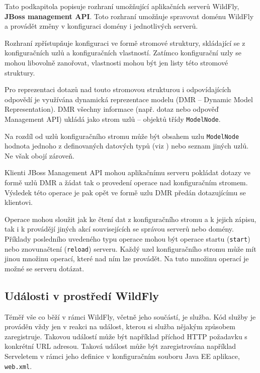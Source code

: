Tato podkapitola popisuje rozhraní umožňující aplikačních serverů WildFly, {\bf JBoss management API}.
Toto rozhraní umožňuje spravovat doménu WildFly a provádět změny v konfiguraci domény i jednotlivých serverů.
\cite{jbossDetypedManagement}

Rozhraní zpřístupňuje konfiguraci ve formě stromové struktury, skládající se z konfiguračních uzlů a konfiguračních vlastností.
Zatímco konfigurační uzly se mohou libovolně zanořovat, vlastnosti mohou být jen listy této stromové struktury.
\cite{jbossDetypedManagement}

Pro reprezentaci dotazů nad touto stromovou strukturou i odpovídajících odpovědí je využívána dynamická reprezentace modelu (DMR -- Dynamic Model Representation).
DMR všechny informace (např. dotaz nebo odpověď Management API) ukládá jako strom uzlů -- objektů třídy {\tt ModelNode}.
\cite{jbossDetypedManagement}

Na rozdíl od uzlů konfiguračního stromu může být obsahem uzlu {\tt ModelNode} hodnota jednoho z definovaných datových typů (viz \cite{jboss7slideShare}) nebo seznam jiných uzlů. Ne však obojí zároveň.
\cite{jboss7slideShare}

Klienti JBoss Management API mohou aplikačnímu serveru pokládat dotazy ve formě uzlů DMR a žádat tak o provedení operace nad konfiguračním stromem.
Výsledek této operace je pak opět ve formě uzlu DMR předán dotazujícímu se klientovi.
\cite{jbossDetypedManagement}

Operace mohou sloužit jak ke čtení dat z konfiguračního stromu a k jejich zápisu, tak i k provádějí jiných akcí souvisejících se správou serverů nebo domény.
Příklady posledního uvedeného typu operace mohou být operace startu ({\tt start}) nebo znovunačtení ({\tt reload}) serveru.
Každý uzel konfiguračního stromu může mít jinou množinu operací, které nad ním lze provádět.
Na tuto množinu operací je možné se serveru dotázat.
\cite{jbossDetypedManagement}

\subsection{Události v prostředí WildFly} \label{udalostiWildFly}

Téměř vše co běží v rámci WildFly, včetně jeho součástí, je služba.
Kód služby je prováděn vždy jen v reakci na událost, kterou si služba nějakým způsobem zaregistruje.
Takovou událostí může být například příchod HTTP požadavku s konkrétní URL adresou.
Taková událost může být zaregistrována například Serveletem v rámci jeho definice v konfiguračním souboru Java EE aplikace, {\tt web.xml}.
\cite{jboss7slideShare}


